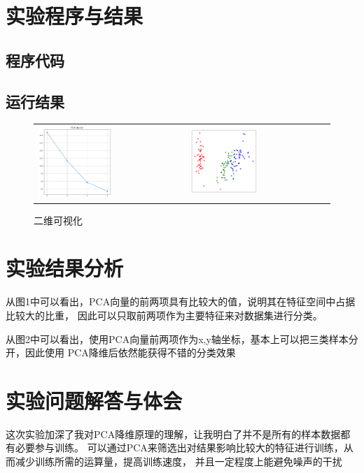 \documentclass[a4paper]{ctexart}
\begin{document}
  \section{实验程序与结果}
  \subsection{程序代码}
  
  \subsection{运行结果}
  \begin{figure}[H]
    \begin{tabular}{p{}p{}}
    \includegraphics[width=0.51\textwidth]{fig/pcavec.png}
    \caption{PCA向量}
    &
    \includegraphics[width=0.49\textwidth]{fig/res.png}
    \caption{二维可视化}
    \end{tabular}
  \end{figure}

  \section{实验结果分析}
  从图1中可以看出，PCA向量的前两项具有比较大的值，说明其在特征空间中占据比较大的比重，
  因此可以只取前两项作为主要特征来对数据集进行分类。

  从图2中可以看出，使用PCA向量前两项作为x,y轴坐标，基本上可以把三类样本分开，因此使用
  PCA降维后依然能获得不错的分类效果
  \section{实验问题解答与体会}
  这次实验加深了我对PCA降维原理的理解，让我明白了并不是所有的样本数据都有必要参与训练。
  可以通过PCA来筛选出对结果影响比较大的特征进行训练，从而减少训练所需的运算量，提高训练速度，
  并且一定程度上能避免噪声的干扰
\end{document}
